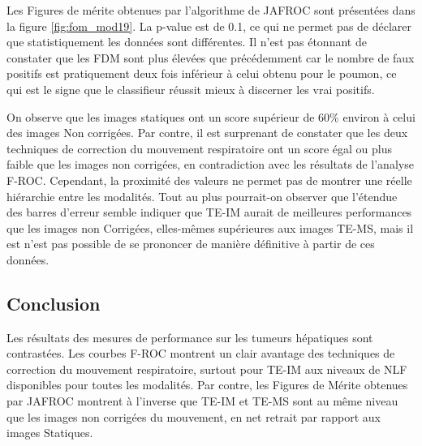 Les Figures de mérite obtenues par l'algorithme de JAFROC sont présentées dans la figure \ref{fig:fom_mod19}. La p-value est de 0.1, ce qui ne permet pas de déclarer que statistiquement les données sont différentes.
Il n'est pas étonnant de constater que les FDM sont plus élevées que précédemment car le nombre de faux positifs est pratiquement deux fois inférieur à celui obtenu pour le poumon, ce qui est le signe que le classifieur réussit mieux à discerner les vrai positifs.

On observe que les images statiques ont un score supérieur de 60\% environ à celui des images Non corrigées. Par contre, il est surprenant de constater que les deux techniques de correction du mouvement respiratoire ont un score égal ou plus faible que les images non corrigées, en contradiction avec les résultats de l'analyse F-ROC. Cependant, la proximité des valeurs ne permet pas de montrer une réelle hiérarchie entre les modalités. Tout au plus pourrait-on observer que l'étendue des barres d'erreur semble indiquer que TE-IM aurait de meilleures performances que les images non Corrigées, elles-mêmes supérieures aux images TE-MS, mais il est n'est pas possible de se prononcer de manière définitive à partir de ces données. 




\subsection{Conclusion}

Les résultats des mesures de performance sur les tumeurs hépatiques sont contrastées. Les courbes F-ROC montrent un clair avantage des techniques de correction du mouvement respiratoire, surtout pour TE-IM aux niveaux de NLF disponibles pour toutes les modalités. Par contre, les Figures de Mérite obtenues par JAFROC montrent à l'inverse que TE-IM et TE-MS sont au même niveau que les images non corrigées du mouvement, en net retrait par rapport aux images Statiques.





